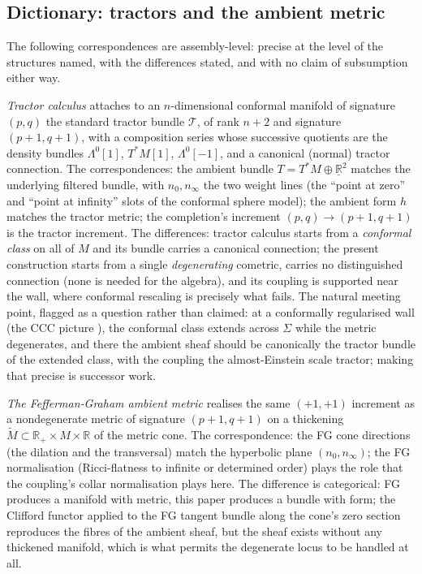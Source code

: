\documentclass[11pt]{article}
\theoremstyle{definition}
\theoremstyle{plain}
\providecommand{\R}{}\renewcommand{\R}{\mathbb{R}}
\providecommand{\Sig}{}\renewcommand{\Sig}{\Sigma}
\providecommand{\nInf}{}\renewcommand{\nInf}{n_\infty}
\providecommand{\nO}{}\renewcommand{\nO}{n_0}
\begin{document}
\subsection*{Dictionary: tractors and the ambient metric}
\label{c:note.sheaf.setting-dictionary-tractors-ambient-metric}
The following correspondences are assembly-level: precise at the level of the structures named, with the differences stated, and with no claim of subsumption either way.

\emph{Tractor calculus} \cite{BEG1994, CurryGover2018} attaches to an $n$-dimensional conformal manifold of signature $(p,q)$ the standard tractor bundle $\mathcal{T}$, of rank $n + 2$ and signature $(p{+}1, q{+}1)$, with a composition series whose successive quotients are the density bundles $\Lambda^0[1]$, $T^*M[1]$, $\Lambda^0[-1]$, and a canonical (normal) tractor connection. The correspondences: the ambient bundle $T = T^*M \oplus \underline{\R}^2$ matches the underlying filtered bundle, with $\nO, \nInf$ the two weight lines (the ``point at zero'' and ``point at infinity'' slots of the conformal sphere model); the ambient form $h$ matches the tractor metric; the completion's increment $(p,q) \to (p{+}1,q{+}1)$ is the tractor increment. The differences: tractor calculus starts from a \emph{conformal class} on all of $M$ and its bundle carries a canonical connection; the present construction starts from a single \emph{degenerating} cometric, carries no distinguished connection (none is needed for the algebra), and its coupling is supported near the wall, where conformal rescaling is precisely what fails. The natural meeting point, flagged as a question rather than claimed: at a conformally regularised wall (the CCC picture \cite{Penrose2010}), the conformal class extends across $\Sig$ while the metric degenerates, and there the ambient sheaf should be canonically the tractor bundle of the extended class, with the coupling the almost-Einstein scale tractor; making that precise is successor work.

\emph{The Fefferman-Graham ambient metric} \cite{FG1985, FG2012} realises the same $(+1,+1)$ increment as a nondegenerate metric of signature $(p{+}1,q{+}1)$ on a thickening $\widetilde{M} \subset \R_+ \times M \times \R$ of the metric cone. The correspondence: the FG cone directions (the dilation and the transversal) match the hyperbolic plane $(\nO, \nInf)$; the FG normalisation (Ricci-flatness to infinite or determined order) plays the role that the coupling's collar normalisation plays here. The difference is categorical: FG produces a manifold with metric, this paper produces a bundle with form; the Clifford functor applied to the FG tangent bundle along the cone's zero section reproduces the fibres of the ambient sheaf, but the sheaf exists without any thickened manifold, which is what permits the degenerate locus to be handled at all.
\end{document}
